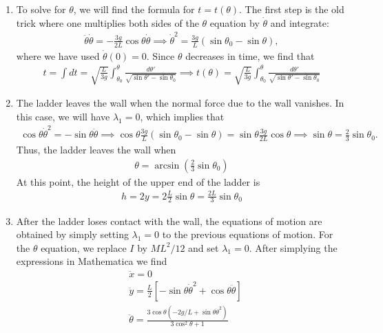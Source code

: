 \documentclass{article}
\theoremstyle{definition}
\newcommand{\f}[2]{\frac{#1}{#2}}
\newcommand{\lp}{\left(}
\newcommand{\rp}{\right)}
\newcommand{\lb}{\left[}
\newcommand{\rb}{\right]}
\begin{document}
\begin{enumerate}[label = (\alph*)]
		\item To solve for $\theta$, we will find the formula for $t=t(\theta)$. The first step is the old trick where one multiplies both sides of the $\theta$ equation by $\dot\theta$ and integrate: 
		\begin{align*}
		\ddot\theta \dot \theta = -\f{3g}{2L}\cos\theta \dot\theta \implies \dot\theta^2 = \f{3g}{L}(\sin\theta_0-\sin\theta),
		\end{align*}
		where we have used $\dot\theta(0) = 0$. Since $\theta$ decreases in time, we find that
		\begin{align*}
		t = \int dt = \sqrt{\f{L}{3g}}\int_{\theta_0}^{\theta} \f{d\theta'}{\sqrt{\sin\theta'-\sin\theta_0}} \implies \boxed{t(\theta) = \sqrt{\f{L}{3g}}\int_{\theta_0}^{\theta} \f{d\theta'}{\sqrt{\sin\theta'-\sin\theta_0}}}
		\end{align*}
		
		\item The ladder leaves the wall when the normal force due to the wall vanishes. In this case, we will have $\lambda_1 = 0$, which implies that
		\begin{align*}
		\cos\theta \dot\theta^2 = -\sin\theta\ddot\theta \implies \cos\theta \f{3g}{L}(\sin\theta_0-\sin\theta) = \sin\theta \f{3g}{2L}\cos\theta \implies \sin\theta = \f{2}{3}\sin\theta_0.
		\end{align*}
		Thus, the ladder leaves the wall when 
		\begin{align*}
		\boxed{\theta = \arcsin\lp \f{2}{3}\sin\theta_0 \rp}
		\end{align*}
		At this point, the height of the upper end of the ladder is 
		\begin{align*}
		h = 2y = 2\f{L}{2} \sin\theta = \boxed{\f{2L}{3}\sin\theta_0}
		\end{align*}
		
		\item After the ladder loses contact with the wall, the equations of motion are obtained by simply setting $\lambda_1 =0$ to the previous equations of motion. For the $\theta$ equation, we replace $I$ by $ML^2/12$ and set $\lambda_1 = 0$. After simplying the expressions in Mathematica we find 
		\begin{align*}
		&\boxed{\ddot{x} = 0}\\
		&\boxed{\ddot{y} = \f{L}{2}\lb -\sin\theta \dot\theta^2 + \cos\theta \ddot\theta \rb  }\\
		&\boxed{\ddot\theta= \frac{3\cos \theta \left(-2g/L + \sin\theta \dot\theta^2\right)}{ 3\cos^2\theta+1}}
		\end{align*}
		

\end{enumerate}
\end{document}
